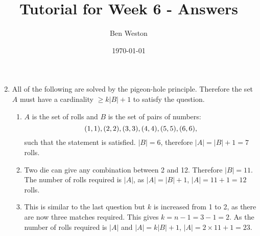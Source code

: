 \documentclass{article}
\title{Tutorial for Week 6 - Answers}
\author{Ben Weston}
\date{\today}
\begin{document}
\maketitle
\begin{enumerate}\setcounter{enumi}{1}
        \item All of the following are solved by the pigeon-hole principle. Therefore the set $A$ must have a cardinality $\geq k|B|+1$ to satisfy the question.
                \begin{enumerate}
                        \item $A$ is the set of rolls and $B$ is the set of pairs of numbers: $$\\{(1,1),(2,2),(3,3),(4,4),(5,5),(6,6)\\},$$ such that the statement is satisfied. $|B|=6$, therefore $|A|=|B|+1=7$ rolls.
                        \item Two die can give any combination between 2 and 12. Therefore $|B|=11$. The number of rolls required is $|A|$, as $|A|=|B|+1$, $|A|=11+1=12$ rolls.
                        \item This is similar to the last question but $k$ is increased from 1 to 2, as there are now three matches required. This gives $k=n-1=3-1=2$. As the number of rolls required is $|A|$ and $|A|=k|B|+1$, $|A|=2\times11+1=23$.
                \end{enumerate}
\end{enumerate}
\end{document}

